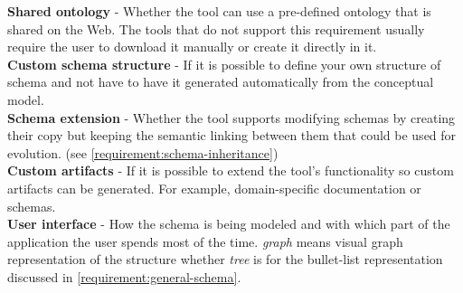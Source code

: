 {\begin{landscape}
\begin{table}
{  \textbf{Shared ontology} - Whether the tool can use a pre-defined ontology that is shared on the Web. The tools that do not support this requirement usually require the user to download it manually or create it directly in it.\\
  \textbf{Custom schema structure} - If it is possible to define your own structure of schema and not have to have it generated automatically from the conceptual model.\\
  \textbf{Schema extension} - Whether the tool supports modifying schemas by creating their copy but keeping the semantic linking between them that could be used for evolution. (see \autoref{requirement:schema-inheritance})\\
  \textbf{Custom artifacts} - If it is possible to extend the tool's functionality so custom artifacts can be generated. For example, domain-specific documentation or schemas.\\
  \textbf{User interface} - How the schema is being modeled and with which part of the application the user spends most of the time. \textit{graph} means visual graph representation of the structure whether \textit{tree} is for the bullet-list representation discussed in \autoref{requirement:general-schema}.
  }
  \end{table}
\end{landscape}}